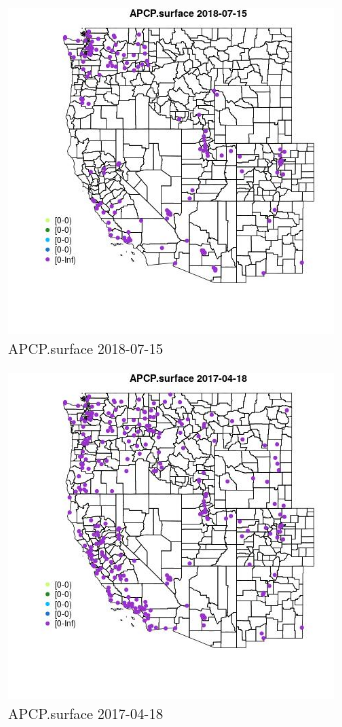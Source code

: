 \begin{figure} 
\centering  
\includegraphics[width=0.77\textwidth]{Code_Outputs/Report_ML_input_PM25_Step4_part_e_de_duplicated_aves_compiled_2019-05-20wNAs_MapObsAPCPsurface2018-07-15.jpg} 
\caption{\label{fig:Report_ML_input_PM25_Step4_part_e_de_duplicated_aves_compiled_2019-05-20wNAsMapObsAPCPsurface2018-07-15}APCP.surface 2018-07-15} 
\end{figure} 
 

\begin{figure} 
\centering  
\includegraphics[width=0.77\textwidth]{Code_Outputs/Report_ML_input_PM25_Step4_part_e_de_duplicated_aves_compiled_2019-05-20wNAs_MapObsAPCPsurface2017-04-18.jpg} 
\caption{\label{fig:Report_ML_input_PM25_Step4_part_e_de_duplicated_aves_compiled_2019-05-20wNAsMapObsAPCPsurface2017-04-18}APCP.surface 2017-04-18} 
\end{figure} 
 

